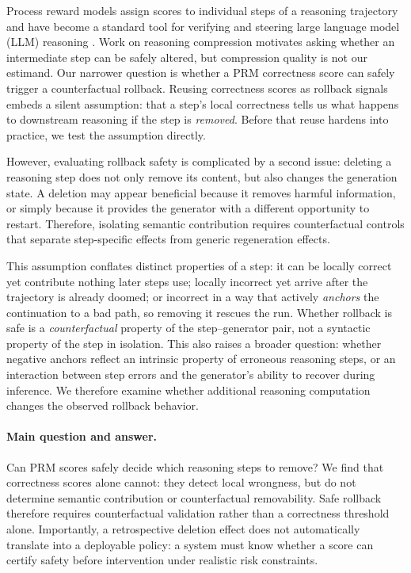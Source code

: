 \documentclass[11pt]{article}
\begin{document}
Process reward models assign scores to individual steps of a reasoning trajectory and have become a standard tool for verifying and steering large language model (LLM) reasoning \citep{lightman2024lets,uesato2022solving,wang2024mathshepherd}. Work on reasoning compression motivates asking whether an intermediate step can be safely altered, but compression quality is not our estimand. Our narrower question is whether a PRM correctness score can safely trigger a counterfactual rollback. Reusing correctness scores as rollback signals embeds a silent assumption: that a step's local correctness tells us what happens to downstream reasoning if the step is \emph{removed}. Before that reuse hardens into practice, we test the assumption directly.

However, evaluating rollback safety is complicated by a second issue: deleting a reasoning step does not only remove its content, but also changes the generation state. A deletion may appear beneficial because it removes harmful information, or simply because it provides the generator with a different opportunity to restart. Therefore, isolating semantic contribution requires counterfactual controls that separate step-specific effects from generic regeneration effects.

This assumption conflates distinct properties of a step: it can be locally correct yet contribute nothing later steps use; locally incorrect yet arrive after the trajectory is already doomed; or incorrect in a way that actively \emph{anchors} the continuation to a bad path, so removing it rescues the run. Whether rollback is safe is a \emph{counterfactual} property of the step--generator pair, not a syntactic property of the step in isolation. This also raises a broader question: whether negative anchors reflect an intrinsic property of erroneous reasoning steps, or an interaction between step errors and the generator's ability to recover during inference. We therefore examine whether additional reasoning computation changes the observed rollback behavior.

\paragraph{Main question and answer.}
Can PRM scores safely decide which reasoning steps to remove? We find that correctness scores alone cannot: they detect local wrongness, but do not determine semantic contribution or counterfactual removability. Safe rollback therefore requires counterfactual validation rather than a correctness threshold alone. Importantly, a retrospective deletion effect does not automatically translate into a deployable policy: a system must know whether a score can certify safety before intervention under realistic risk constraints.
\end{document}
